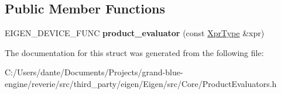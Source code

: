 \subsection*{Public Member Functions}
\begin{DoxyCompactItemize}
\item 
\mbox{\label{struct_eigen_1_1internal_1_1product__evaluator_3_01_product_3_01_lhs_00_01_rhs_00_01_default_pro06ca9210bc576c533682d6dfc3cec111_a49e30ab3bd6c6cecebdbd4e97f24a824}} 
E\+I\+G\+E\+N\+\_\+\+D\+E\+V\+I\+C\+E\+\_\+\+F\+U\+NC {\bfseries product\+\_\+evaluator} (const \mbox{\hyperlink{class_eigen_1_1_product}{Xpr\+Type}} \&xpr)
\end{DoxyCompactItemize}


The documentation for this struct was generated from the following file\+:\begin{DoxyCompactItemize}
\item 
C\+:/\+Users/dante/\+Documents/\+Projects/grand-\/blue-\/engine/reverie/src/third\+\_\+party/eigen/\+Eigen/src/\+Core/Product\+Evaluators.\+h\end{DoxyCompactItemize}
